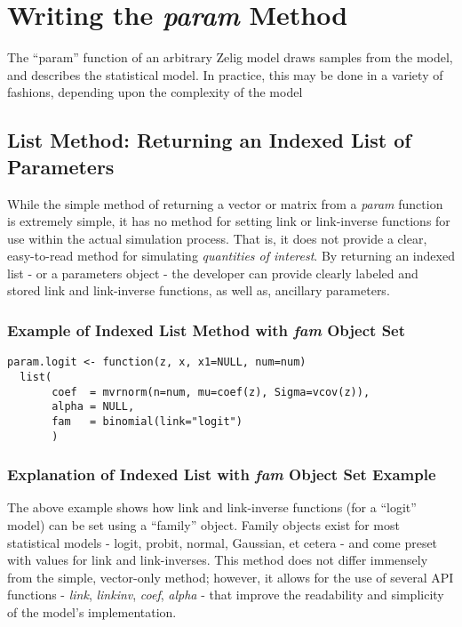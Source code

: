 \section{Writing the \emph{param} Method}

The ``param'' function of an arbitrary Zelig model draws samples from the
model, and describes the statistical model.  In practice, this may be done
in a variety of fashions, depending upon the complexity of the model


\subsection{List Method: Returning an Indexed List of Parameters}

While the simple method of returning a vector or matrix from a \emph{param} function is extremely simple, it has no method for setting link or link-inverse functions for use within the actual simulation process.  That is, it does not provide a clear, easy-to-read method for simulating \emph{quantities of interest}.  By returning an indexed list - or a parameters object - the developer can provide clearly labeled and stored link and link-inverse functions, as well as, ancillary parameters.


\subsubsection{Example of Indexed List Method with \emph{fam} Object Set}

\begin{verbatim}
param.logit <- function(z, x, x1=NULL, num=num)
  list(
       coef  = mvrnorm(n=num, mu=coef(z), Sigma=vcov(z)),
       alpha = NULL,
       fam   = binomial(link="logit")
       )
\end{verbatim}


\subsubsection{Explanation of Indexed List with \emph{fam} Object Set Example}

The above example shows how link and link-inverse functions (for a ``logit'' model) can be set using a ``family'' object.  Family objects exist for most statistical models - logit, probit, normal, Gaussian, et cetera - and come preset with values for link and link-inverses.  This method does not differ immensely from the simple, vector-only method; however, it allows for the use of several API functions - \emph{link}, \emph{linkinv}, \emph{coef}, \emph{alpha} - that improve the readability and simplicity of the model's implementation.

